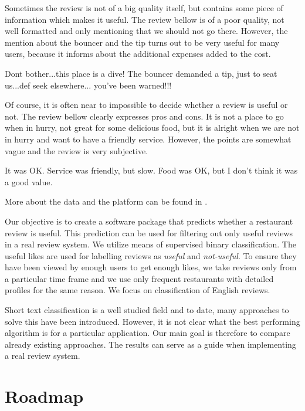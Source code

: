 Sometimes the review is not of a big quality itself, but contains some piece of information which makes it useful.
The review bellow is of a poor quality, not well formatted and only mentioning that we should not go there.
However, the mention about the bouncer and the tip turns out to be very useful for many users,
because it informs about the additional expenses added to the cost.

\begin{code}
Dont bother...this place is a dive!
The bouncer demanded a tip, just to seat us...def seek elsewhere...
you've been warned!!!
\end{code}

Of course, it is often near to impossible to decide whether a review is useful or not.
The review bellow clearly expresses pros and cons.
It is not a place to go when in hurry, not great for some delicious food,
but it is alright when we are not in hurry and want to have a friendly service.
However, the points are somewhat vague and the review is very subjective.

\begin{code}
It was OK. Service was friendly, but slow.
Food was OK, but I don't think it was a good value.
\end{code}


More about the data and the platform can be found in .

Our objective is to create a software package that predicts whether
a restaurant review is useful.
This prediction can be used for filtering out only useful reviews in a real review system.
We utilize means of supervised binary classification.
The useful likes are used for labelling reviews as \textit{useful} and \textit{not-useful}.
To ensure they have been viewed by enough users to get enough likes,
we take reviews only from a particular time frame
and we use only frequent restaurants with detailed profiles for the same reason.
We focus on classification of English reviews.

Short text classification is a well studied field and to date, many approaches to solve this have been introduced.
However, it is not clear what the best performing algorithm is for a particular application.
Our main goal is therefore to compare already existing approaches.
The results can serve as a guide when implementing a real review system.

\section{Roadmap}

